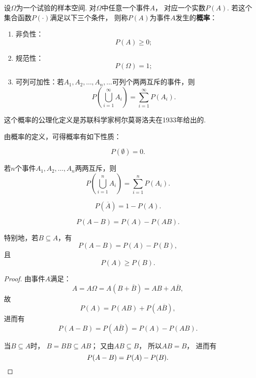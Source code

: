 \begin{definition}
设\(\Omega\)为一个试验的样本空间.
对\(\Omega\)中任意一个事件\(A\)，%
对应一个实数\(P(A)\).
若这个集合函数\(P(\cdot)\)满足以下三个条件，%
则称\(P(A)\)为事件\(A\)发生的\textbf{概率}：
\begin{enumerate}
\item 非负性：\begin{equation}
P(A) \geqslant 0;
\end{equation}
\item 规范性：\begin{equation}
P(\Omega) = 1;
\end{equation}
\item 可列可加性：若\(A_1,A_2,\dotsc,A_n,\dotsc\)可列个两两互斥的事件，则\begin{equation}
P\left(\bigcup_{i=1}^{\infty}{A_i}\right)
= \sum\limits_{i=1}^{\infty}{P(A_i)}.
\end{equation}
\end{enumerate}
\end{definition}
这个概率的公理化定义是苏联科学家柯尔莫哥洛夫在1933年给出的.

由概率的定义，可得概率有如下性质：
\begin{property}
\begin{equation}
P(\emptyset) = 0.
\end{equation}
\end{property}

\begin{property}[有限可加性]
若\(n\)个事件\(A_1,A_2,\dotsc,A_n\)两两互斥，则\begin{equation}
P\left(\bigcup_{i=1}^{n}{A_i}\right)
= \sum\limits_{i=1}^{n}{P(A_i)}.
\end{equation}
\end{property}

\begin{property}
\begin{equation}
P(\overline{A}) = 1 - P(A).
\end{equation}
\end{property}

\begin{property}[概率的减法]
\begin{equation}
P(A - B) = P(A) - P(AB).
\end{equation}

特别地，若\(B \subseteq A\)，有
\begin{equation}
P(A - B) = P(A) - P(B),
\end{equation}
且
\begin{equation}
P(A) \geqslant P(B).
\end{equation}

\begin{proof}
由事件\(A\)满足：\[
A = A \Omega
= A(B+\overline{B})
= AB+A\overline{B},
\]故\[
P(A) = P(AB)+P(A\overline{B}),
\]进而有\[
P(A-B) = P(A\overline{B}) = P(A) - P(AB).
\]

当\(B \subseteq A\)时，%
\(B = BB \subseteq AB\)；
又由\(AB \subseteq B\)，%
所以\(AB = B\)，%
进而有\[
P(A-B) = P(A) - P(B).
\qedhere
\]
\end{proof}
\end{property}

